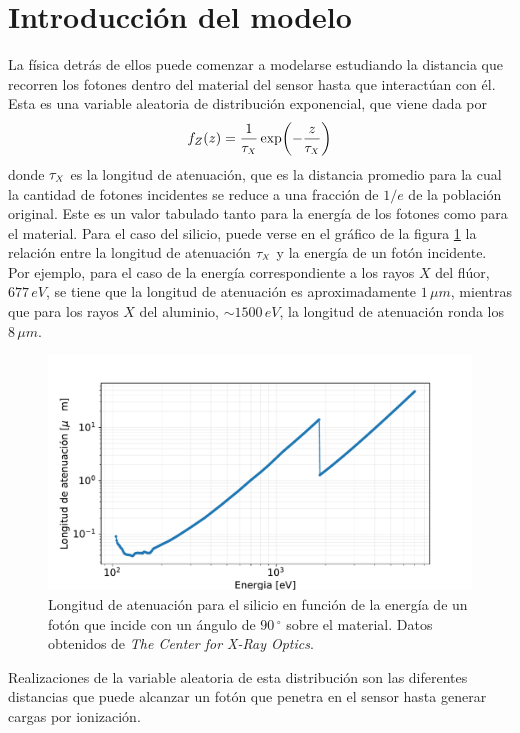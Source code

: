 \section{Introducción del modelo}
\noindent La física detrás de ellos puede comenzar a modelarse estudiando la distancia que recorren los fotones dentro del material del sensor hasta que interactúan con él. Esta es una variable aleatoria de distribución exponencial, que viene dada por
\begin{equation}
    f_{Z}(z) = \frac{1}{\tau_{\scaleto{X}{4pt}}}\exp(-\frac{z}{\tau_{\scaleto{X}{4pt}}})
        \label{ec:DistribucionDistancias}
\end{equation}
donde $\tau_{\scaleto{X}{4pt}}$ es la longitud de atenuación, que es la distancia promedio para la cual la cantidad de fotones incidentes se reduce a una fracción de $1/e$ de la población original. Este es un valor tabulado tanto para la energía de los fotones como para el material. Para el caso del silicio, puede verse en el gráfico de la figura \ref{fig:Attenuation} la relación entre la longitud de atenuación $\tau_{\scaleto{X}{4pt}}$ y la energía de un fotón incidente. Por ejemplo, para el caso de la energía correspondiente a los rayos $X$ del flúor, $677\,\si{eV}$, se tiene que la longitud de atenuación es aproximadamente $1\,\si{\mu m}$, mientras que para los rayos $X$ del aluminio, $\sim 1500\,\si{eV}$, la longitud de atenuación ronda los $8\,\si{\mu m}$.
\begin{figure}[h]
    \centering
        \includegraphics[scale=0.5]{Figs/AttenuationLength.pdf}
    \caption{\footnotesize{Longitud de atenuación para el silicio en función de la energía de un fotón que incide con un ángulo de $90\,^{\circ}$ sobre el material. Datos obtenidos de \textit{The Center for X-Ray Optics}\cite{AttenuationLength}.}}
    \label{fig:Attenuation}
\end{figure}
Realizaciones de la variable aleatoria de esta distribución son las diferentes distancias que puede alcanzar un fotón que penetra en el sensor hasta generar cargas por ionización.


